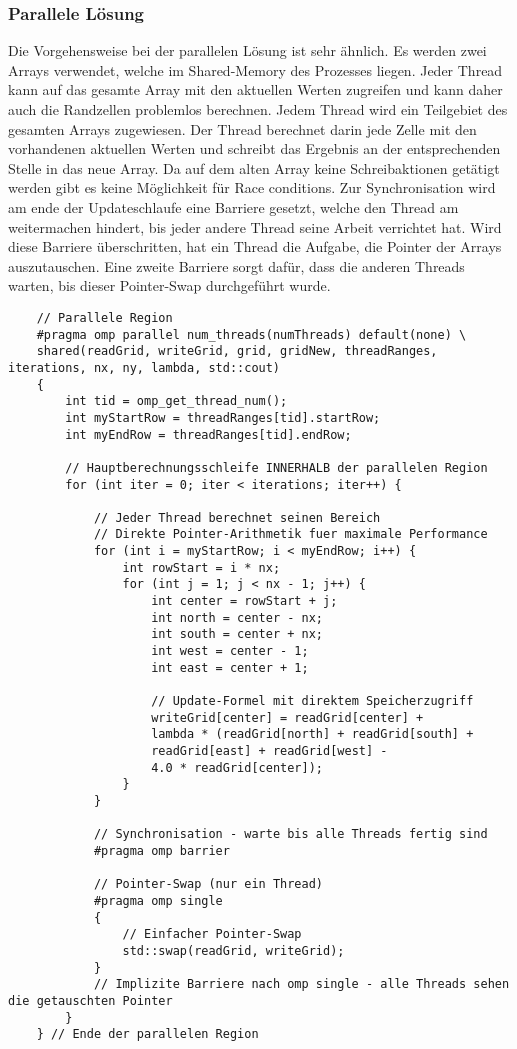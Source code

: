 \subsubsection{Parallele Lösung 
\label{parallelisierung:sub:parLoesung}}
Die Vorgehensweise bei der parallelen Lösung ist sehr ähnlich.
Es werden zwei Arrays verwendet, welche im Shared-Memory des Prozesses liegen.
Jeder Thread kann auf das gesamte Array mit den aktuellen Werten zugreifen und kann daher auch die Randzellen problemlos berechnen.
Jedem Thread wird ein Teilgebiet des gesamten Arrays zugewiesen.
Der Thread berechnet darin jede Zelle mit den vorhandenen aktuellen Werten und schreibt das Ergebnis an der entsprechenden Stelle in das neue Array.
Da auf dem alten Array keine Schreibaktionen getätigt werden gibt es keine Möglichkeit für Race conditions.
Zur Synchronisation wird am ende der Updateschlaufe eine Barriere gesetzt, welche den Thread am weitermachen hindert, bis jeder andere Thread seine Arbeit verrichtet hat.
Wird diese Barriere überschritten, hat ein Thread die Aufgabe, die Pointer der Arrays auszutauschen.
Eine zweite Barriere sorgt dafür, dass die anderen Threads warten, bis dieser Pointer-Swap durchgeführt wurde.

\begin{lstlisting}
	// Parallele Region
	#pragma omp parallel num_threads(numThreads) default(none) \
	shared(readGrid, writeGrid, grid, gridNew, threadRanges, iterations, nx, ny, lambda, std::cout)
	{
		int tid = omp_get_thread_num();
		int myStartRow = threadRanges[tid].startRow;
		int myEndRow = threadRanges[tid].endRow;
		
		// Hauptberechnungsschleife INNERHALB der parallelen Region
		for (int iter = 0; iter < iterations; iter++) {
			
			// Jeder Thread berechnet seinen Bereich
			// Direkte Pointer-Arithmetik fuer maximale Performance
			for (int i = myStartRow; i < myEndRow; i++) {
				int rowStart = i * nx;
				for (int j = 1; j < nx - 1; j++) {
					int center = rowStart + j;
					int north = center - nx;
					int south = center + nx;
					int west = center - 1;
					int east = center + 1;
					
					// Update-Formel mit direktem Speicherzugriff
					writeGrid[center] = readGrid[center] +
					lambda * (readGrid[north] + readGrid[south] +
					readGrid[east] + readGrid[west] -
					4.0 * readGrid[center]);
				}
			}
			
			// Synchronisation - warte bis alle Threads fertig sind
			#pragma omp barrier
			
			// Pointer-Swap (nur ein Thread)
			#pragma omp single
			{
				// Einfacher Pointer-Swap
				std::swap(readGrid, writeGrid);
			}
			// Implizite Barriere nach omp single - alle Threads sehen die getauschten Pointer
		}
	} // Ende der parallelen Region
\end{lstlisting}
	
